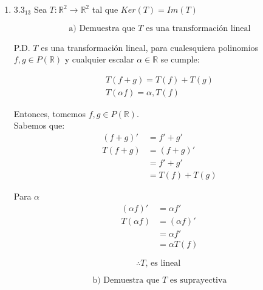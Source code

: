 \documentclass{article}
\begin{document}
		\begin{enumerate}
			
			
			\item[] \(3.3_{13}\) Sea \(T:\mathbb{R}^2\to\mathbb{R}^2\) tal que \(Ker(T)=Im(T)\)
			
			\begin{equation*}
				\text{a) Demuestra que } T \text{ es una transformación lineal}
			\end{equation*}
			
			P.D. \(T\) es una transformación lineal, para cualesquiera polinomios \(f,g\in P (\mathbb{R})\) y cualquier escalar \(\alpha \in \mathbb{R}\) se cumple:
			
			\begin{equation*}
				\begin{aligned}
					T(f+g) = T(f) + T(g) \\
					T(\alpha f) = \alpha, T(f)
				\end{aligned}
			\end{equation*}
			
			Entonces, tomemos \(f,g\in P(\mathbb{R})\). \\
			Sabemos que: 
			\begin{equation*}
				\begin{aligned}
					(f+g)' &=f'+g' \\
					T(f+g) &= (f+g)' \\
						   &= f'+g' \\
					&=T(f)+T(g)
				\end{aligned}
			\end{equation*}
			
			Para $\alpha$ \\
			\begin{equation*}
				\begin{aligned}
					(\alpha f)' &=\alpha f' \\
					T(\alpha f) &=(\alpha f)' \\
								&=\alpha f' \\
								&=\alpha T(f)
				\end{aligned}
			\end{equation*}
			
			\[
			\boxed{\therefore T \text{, es lineal }}
			\]
			
			\begin{equation*}
				\text{b) Demuestra que } T \text{ es suprayectiva}
			\end{equation*}
			

\end{enumerate}
\end{document}
